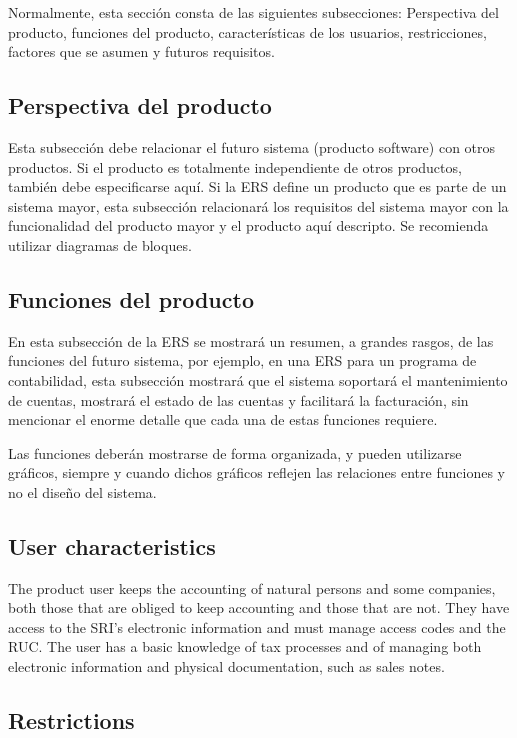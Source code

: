 \documentclass[12pt,a4paper, twosite]{article}
\begin{document}
Normalmente, esta sección consta de las siguientes subsecciones:
Perspectiva del producto, funciones del producto, características de
los usuarios, restricciones, factores que se asumen y futuros
requisitos.


\subsection{Perspectiva del producto}
\label{sec:org24980a8}

Esta subsección debe relacionar el futuro sistema (producto
software) con otros productos. Si el producto es totalmente
independiente de otros productos, también debe especificarse
aquí. Si la ERS define un producto que es parte de un sistema mayor,
esta subsección relacionará los requisitos del sistema mayor con la
funcionalidad del producto mayor y el producto aquí descripto. Se
recomienda utilizar diagramas de bloques.


\subsection{Funciones del producto}
\label{sec:orgaf51da6}

En esta subsección de la ERS se mostrará un resumen, a grandes
rasgos, de las funciones del futuro sistema, por ejemplo, en una ERS
para un programa de contabilidad, esta subsección mostrará que el
sistema soportará el mantenimiento de cuentas, mostrará el estado de
las cuentas y facilitará la facturación, sin mencionar el enorme
detalle que cada una de estas funciones requiere.

Las funciones deberán mostrarse de forma organizada, y pueden
utilizarse gráficos, siempre y cuando dichos gráficos reflejen las
relaciones entre funciones y no el diseño del sistema.


\subsection{User characteristics}
\label{sec:orga40b0ee}

The product user keeps the accounting of natural persons and some companies, both those that are obliged to keep accounting and those that are not. They have access to the SRI's electronic information and must manage access codes and the RUC. The user has a basic knowledge of tax processes and of managing both electronic information and physical documentation, such as sales notes. 


\subsection{Restrictions}
\label{sec:org5ca5790}
\end{document}

